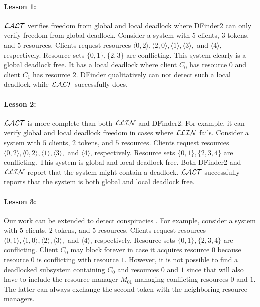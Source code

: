 \paragraph{Lesson 1:} 
$\mathcal{LALT}$ verifies freedom from global and local deadlock where DFinder2 can only verify freedom from global deadlock.
Consider a system with $5$ clients, $3$ tokens, and $5$ resources.
Clients request resources $\langle 0, 2\rangle, \langle 2, 0\rangle, \langle 1 \rangle, \langle 3\rangle,$ and $\langle 4\rangle$, respectively.
Resource sets $\{ 0, 1\}, \{2,3\}$ are conflicting. 
This system clearly is a global deadlock free. 
It has a local deadlock where client $C_0$ has resource $0$ and client $C_1$ has resource $2$. 
DFinder qualitatively can not detect such a local deadlock while $\mathcal{LALT}$ successfully does. 

\paragraph{Lesson 2:} 
$\mathcal{LALT}$ is more complete than both $\mathcal{LLIN}$ and DFinder2. For example, it can verify global and local deadlock freedom in cases where $\mathcal{LLIN}$ fails. 
Consider a system with $5$ clients, $2$ tokens, and $5$ resources.
Clients request resources $\langle0, 2\rangle, \langle 0, 2\rangle, \langle 1 \rangle, \langle 3\rangle,$ and $\langle 4\rangle$, respectively.
Resource sets $\{ 0, 1\}, \{2,3,4\}$ are conflicting. 
This system is global and local deadlock free. 
Both DFinder2 and $\mathcal{LLIN}$ report that the system might contain a deadlock. 
$\mathcal{LALT}$ successfully reports that the system is both global and local deadlock free. 

\paragraph{Lesson 3:}
Our work can be extended to detect conspiracies \cite{AFG93}.
For example, consider a system with
$5$ clients, $2$ tokens, and $5$ resources.
Clients request resources $\langle 0, 1\rangle, \langle 1, 0\rangle, \langle 2 \rangle, \langle 3\rangle,$ and $\langle 4\rangle$, respectively.
Resource sets $\{ 0, 1\}, \{2,3,4\}$ are conflicting. 
Client $C_0$ may block forever in case it acquires resource $0$ because resource $0$ is conflicting with resource $1$. 
However, it is not possible to find a deadlocked subsystem containing $C_0$ and resources $0$ and $1$ since that will also have
to include the resource manager $M_{01}$ managing conflicting resources $0$ and $1$. 
The latter can always exchange the second token with the neighboring resource managers. 

